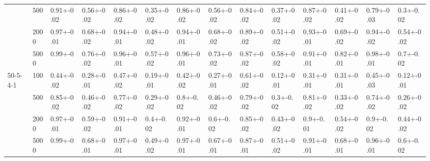 \documentclass{svmult}
\begin{document}
\begin{landscape}
\begin{center}
{\begin{tabular}{llllllllllllll}
           & 500     & 0.91+-0.02                    & 0.56+-0.02                 & 0.86+-0.02                    & 0.35+-0.02                 & 0.86+-0.02                    & 0.56+-0.02                 & 0.84+-0.02                    & 0.37+-0.02                 & 0.87+-0.02                    & 0.41+-0.02                 & 0.79+-0.03                    & 0.3+-0.02                  \\
           & 2000    & 0.97+-0.01                    & 0.68+-0.02                 & 0.94+-0.01                    & 0.48+-0.02                 & 0.94+-0.01                    & 0.68+-0.02                 & 0.89+-0.02                    & 0.51+-0.02                 & 0.93+-0.01                    & 0.69+-0.02                 & 0.94+-0.02                    & 0.54+-0.02                 \\
           & 5000    & 0.99+-0                       & 0.76+-0.02                 & 0.96+-0.01                    & 0.57+-0.02                 & 0.96+-0.01                    & 0.73+-0.02                 & 0.87+-0.02                    & 0.58+-0.02                 & 0.91+-0.01                    & 0.82+-0.01                 & 0.98+-0.01                    & 0.7+-0.02                  \\ \hline
50-5-4-1   & 100     & 0.44+-0.02                    & 0.28+-0.01                 & 0.47+-0.02                    & 0.19+-0.01                 & 0.42+-0.02                    & 0.27+-0.01                 & 0.61+-0.02                    & 0.12+-0.01                 & 0.31+-0.01                    & 0.31+-0.01                 & 0.45+-0.03                    & 0.12+-0.01                 \\
           & 500     & 0.85+-0.02                    & 0.46+-0.02                 & 0.77+-0.02                    & 0.29+-0.02                 & 0.8+-0.02                     & 0.46+-0.02                 & 0.79+-0.02                    & 0.3+-0.02                  & 0.81+-0.02                    & 0.33+-0.02                 & 0.74+-0.02                    & 0.26+-0.02                 \\
           & 2000    & 0.97+-0.01                    & 0.59+-0.02                 & 0.91+-0.01                    & 0.4+-0.02                  & 0.92+-0.01                    & 0.6+-0.02                  & 0.85+-0.02                    & 0.43+-0.02                 & 0.9+-0.01                     & 0.54+-0.02                 & 0.9+-0.02                     & 0.44+-0.02                 \\
           & 5000    & 0.99+-0                       & 0.68+-0.01                 & 0.97+-0.01                    & 0.49+-0.02                 & 0.97+-0.01                    & 0.67+-0.01                 & 0.87+-0.01                    & 0.51+-0.02                 & 0.91+-0.01                    & 0.68+-0.01                 & 0.96+-0.01                    & 0.6+-0.02                  \\ \hline
\end{tabular}}
\end{center}
\end{landscape}
\end{document}
